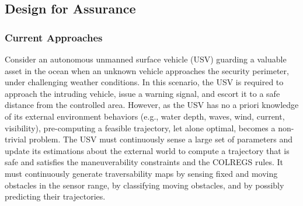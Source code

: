 


\subsection{Design for Assurance}
\subsubsection{Current Approaches}



Consider an autonomous unmanned surface vehicle (USV) guarding a valuable asset in the ocean when an unknown vehicle  approaches the security perimeter, under challenging weather conditions. In this scenario, the USV is required to approach the intruding vehicle, issue a warning signal, and escort it to a safe distance from the controlled area. However, as the USV has no a priori knowledge of its external environment behaviors (e.g., water depth, waves, wind, current, visibility), pre-computing a feasible trajectory, let alone optimal, becomes a non-trivial problem. The USV must continuously sense a large set of parameters and update its estimations about the external world to compute a trajectory that is safe and satisfies the maneuverability constraints and the COLREGS rules. It must continuously generate traversability maps by sensing fixed and moving obstacles in the sensor range, by classifying moving obstacles, and by possibly predicting their trajectories.  
%
 
